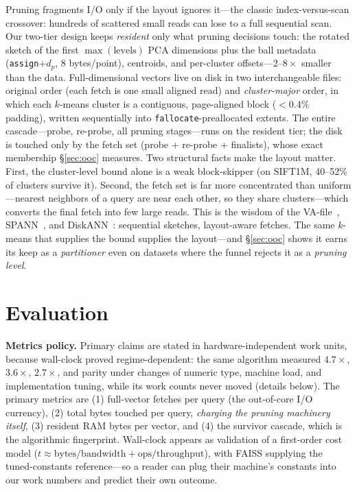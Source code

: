 \documentclass[sigconf,nonacm]{acmart}
\begin{document}
Pruning fragments I/O only if the layout ignores it---the classic
index-versus-scan crossover: hundreds of scattered small reads can lose to
a full sequential scan. Our two-tier design keeps \emph{resident} only what
pruning decisions touch: the rotated sketch of the first
$\max(\mathrm{levels})$ PCA dimensions plus the ball metadata
(\texttt{assign}${+}d_p$, 8 bytes/point), centroids, and per-cluster
offsets---$2$--$8\times$ smaller than the data. Full-dimensional vectors
live on disk in two interchangeable files: original order (each fetch is
one small aligned read) and \emph{cluster-major} order, in which each
$k$-means cluster is a contiguous, page-aligned block ($<$0.4\% padding),
written sequentially into \texttt{fallocate}-preallocated extents. The
entire cascade---probe, re-probe, all pruning stages---runs on the resident
tier; the disk is touched only by the fetch set (probe $+$ re-probe $+$
finalists), whose exact membership \S\ref{sec:ooc} measures. Two structural
facts make the layout matter. First, the cluster-level bound alone is a
weak block-skipper (on SIFT1M, 40--52\% of clusters survive it). Second,
the fetch set is far more concentrated than uniform---nearest neighbors of
a query are near each other, so they share clusters---which converts the
final fetch into few large reads. This is the wisdom of the
VA-file~\cite{vafile}, SPANN~\cite{spann}, and DiskANN~\cite{diskann}:
sequential sketches, layout-aware fetches. The same $k$-means that supplies
the bound supplies the layout---and \S\ref{sec:ooc} shows it earns its keep
as a \emph{partitioner} even on datasets where the funnel rejects it as a
\emph{pruning level}.

\section{Evaluation}
\label{sec:eval}

\textbf{Metrics policy.} Primary claims are stated in hardware-independent
work units, because wall-clock proved regime-dependent: the same algorithm
measured $4.7\times$, $3.6\times$, $2.7\times$, and parity under changes of
numeric type, machine load, and implementation tuning, while its work counts
never moved (details below). The primary metrics are (1) full-vector fetches
per query (the out-of-core I/O currency), (2) total bytes touched per query,
\emph{charging the pruning machinery itself}, (3) resident RAM bytes per
vector, and (4) the survivor cascade, which is the algorithmic fingerprint.
Wall-clock appears as validation of a first-order cost model
($t \approx \mathrm{bytes}/\mathrm{bandwidth} +
\mathrm{ops}/\mathrm{throughput}$), with FAISS supplying the tuned-constants
reference---so a reader can plug their machine's constants into our work
numbers and predict their own outcome.
\end{document}
